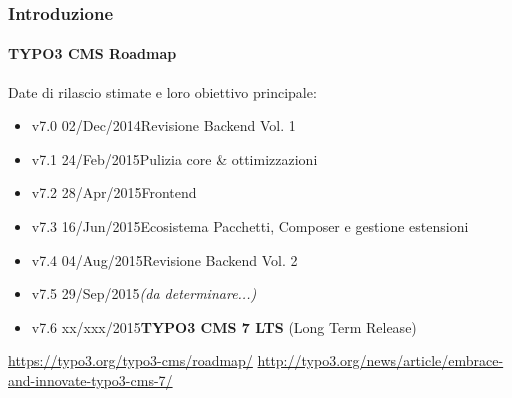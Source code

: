 \begin{frame}[fragile]
	\frametitle{Introduzione}
	\framesubtitle{TYPO3 CMS Roadmap}

	Date di rilascio stimate e loro obiettivo principale:

	\begin{itemize}
		\item v7.0 \tabto{1.0cm}02/Dec/2014\tabto{3.4cm}Revisione Backend Vol. 1
		\item v7.1 \tabto{1.0cm}24/Feb/2015\tabto{3.4cm}Pulizia core \& ottimizzazioni
		\item v7.2 \tabto{1.0cm}28/Apr/2015\tabto{3.4cm}Frontend

		\item
			\begingroup
				\color{typo3orange}
					v7.3 \tabto{1.0cm}16/Jun/2015\tabto{3.4cm}Ecosistema Pacchetti, Composer\newline
					\tabto{3.4cm}e gestione estensioni
			\endgroup

		\item v7.4 \tabto{1.0cm}04/Aug/2015\tabto{3.4cm}Revisione Backend Vol. 2
		\item v7.5 \tabto{1.0cm}29/Sep/2015\tabto{3.4cm}\textit{(da determinare...)}
		\item v7.6 \tabto{1.0cm}xx/xxx/2015\tabto{3.4cm}\textbf{TYPO3 CMS 7 LTS} (Long Term Release)
	\end{itemize}

	\smaller
		\url{https://typo3.org/typo3-cms/roadmap/}\newline
		\url{http://typo3.org/news/article/embrace-and-innovate-typo3-cms-7/}
	\normalsize

\end{frame}

